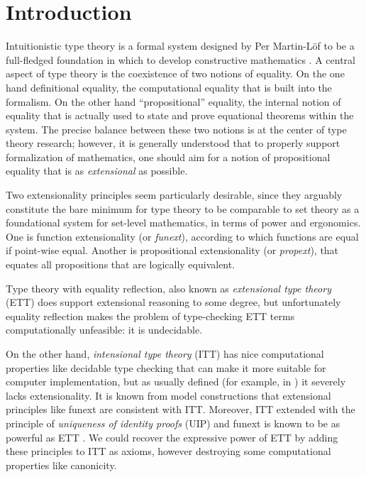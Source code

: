 \documentclass[a4paper,UKenglish,cleveref, autoref, thm-restate]{lipics-v2019}
\begin{document}
\section{Introduction}

Intuitionistic type theory is a formal system designed by Per Martin-L\"of to be
a full-fledged foundation in which to develop constructive mathematics
\cite{mltt75, libretto}.
%
A central aspect of type theory is the coexistence of two notions of
equality. On the one hand definitional equality, the computational equality that
is built into the formalism. On the other hand ``propositional'' equality, the
internal notion of equality that is actually used to state and prove equational
theorems within the system. The precise balance between these two notions is at
the center of type theory research; however, it is generally understood that to
properly support formalization of mathematics, one should aim for a notion of
propositional equality that is as \emph{extensional} as possible.

Two extensionality principles seem particularly desirable, since they arguably
constitute the bare minimum for type theory to be comparable to set theory as a
foundational system for set-level mathematics, in terms of power and ergonomics.
One is function extensionality (or \emph{funext}), according to which functions
are equal if point-wise equal. Another is propositional extensionality
(or \emph{propext}), that equates all propositions that are logically equivalent.

Type theory with equality reflection, also known as \emph{extensional type
  theory} (ETT) does support extensional reasoning to some degree, but
unfortunately equality reflection makes the problem of type-checking ETT terms
computationally unfeasible: it is undecidable.

On the other hand, \emph{intensional type theory} (ITT) has nice computational
properties like decidable type checking that can make it more suitable for
computer implementation, but as usually defined (for example, in \cite{mltt75})
it severely lacks extensionality.
%
It is known from model constructions that extensional principles like funext are
consistent with ITT.
%
Moreover, ITT extended with the principle of \emph{uniqueness of identity
  proofs} (UIP) and funext is known to be as powerful as ETT
\cite{conservativity}. We could recover the expressive power of ETT by adding
these principles to ITT as axioms, however destroying some computational
properties like canonicity.
\end{document}
